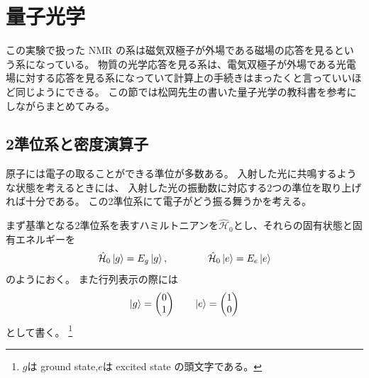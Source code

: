 \documentclass[11pt,dvipdfmx,a4paper]{jsarticle}
\begin{document}

\section{量子光学}
この実験で扱った NMR の系は磁気双極子が外場である磁場の応答を見るという系になっている。
物質の光学応答を見る系は、電気双極子が外場である光電場に対する応答を見る系になっていて計算上の手続きはまったくと言っていいほど同じようにできる。
この節では松岡先生の書いた量子光学の教科書\cite{Matsuoka_2000}を参考にしながらまとめてみる。
\subsection{2準位系と密度演算子}
原子には電子の取ることができる準位が多数ある。
入射した光に共鳴するような状態を考えるときには、
入射した光の振動数に対応する2つの準位を取り上げれば十分である。
この2準位系にて電子がどう振る舞うかを考える。

まず基準となる2準位系を表すハミルトニアンを\(\hat{\mathcal{H}}_0\)とし、それらの固有状態と固有エネルギーを
\begin{equation}
	\hat{\mathcal{H}}_0 \ket{g} = E_g \ket{g}, \qquad \qquad \hat{\mathcal{H}}_0 \ket{e} = E_e \ket{e}
\end{equation}
のようにおく。
また行列表示の際には
\begin{equation}
	\ket{g} =
	\begin{pmatrix}
		0\\
		1
	\end{pmatrix}
	\qquad
	\ket{e} =
	\begin{pmatrix}
		1 \\
		0
	\end{pmatrix}
\end{equation}
として書く。
\footnote{\(g\)は ground state,\(e\)は excited state の頭文字である。}
\end{document}
